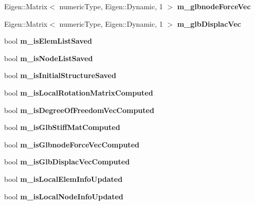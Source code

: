 \begin{DoxyCompactItemize}
Eigen\+::\+Matrix$<$ numeric\+Type, Eigen\+::\+Dynamic, 1 $>$ {\bfseries m\+\_\+glbnode\+Force\+Vec}
\item 
\mbox{\label{classbase_structural_analysis_class_a9c92d5720fc03e77a2b30a8e5277aeba}} 
Eigen\+::\+Matrix$<$ numeric\+Type, Eigen\+::\+Dynamic, 1 $>$ {\bfseries m\+\_\+glb\+Displac\+Vec}
\item 
\mbox{\label{classbase_structural_analysis_class_a3497fd3dc60eb8cf056a3d3828000bb2}} 
bool {\bfseries m\+\_\+is\+Elem\+List\+Saved}
\item 
\mbox{\label{classbase_structural_analysis_class_a9a89aee1ea437bb8f1a633860b306633}} 
bool {\bfseries m\+\_\+is\+Node\+List\+Saved}
\item 
\mbox{\label{classbase_structural_analysis_class_aeda5815de358a24f99b194854252e94b}} 
bool {\bfseries m\+\_\+is\+Initial\+Structure\+Saved}
\item 
\mbox{\label{classbase_structural_analysis_class_ad5e1782b128ac071695aae4ee8d7d23a}} 
bool {\bfseries m\+\_\+is\+Local\+Rotation\+Matrix\+Computed}
\item 
\mbox{\label{classbase_structural_analysis_class_a60baf19b10caa39342408548d5a834ac}} 
bool {\bfseries m\+\_\+is\+Degree\+Of\+Freedom\+Vec\+Computed}
\item 
\mbox{\label{classbase_structural_analysis_class_af6d2f4bea68e4bd857a2ac6bea8194ec}} 
bool {\bfseries m\+\_\+is\+Glb\+Stiff\+Mat\+Computed}
\item 
\mbox{\label{classbase_structural_analysis_class_a779af0fab2226dacec87b0f6a05e1956}} 
bool {\bfseries m\+\_\+is\+Glbnode\+Force\+Vec\+Computed}
\item 
\mbox{\label{classbase_structural_analysis_class_a920c4ef5aedc3e9bf397c7d67786e696}} 
bool {\bfseries m\+\_\+is\+Glb\+Displac\+Vec\+Computed}
\item 
\mbox{\label{classbase_structural_analysis_class_ac89e923d65f5fc5f8e08d15bf5b65bb5}} 
bool {\bfseries m\+\_\+is\+Local\+Elem\+Info\+Updated}
\item 
\mbox{\label{classbase_structural_analysis_class_a5930a49c82de1cc5d03d0b44788f8af0}} 
bool {\bfseries m\+\_\+is\+Local\+Node\+Info\+Updated}
\end{DoxyCompactItemize}


